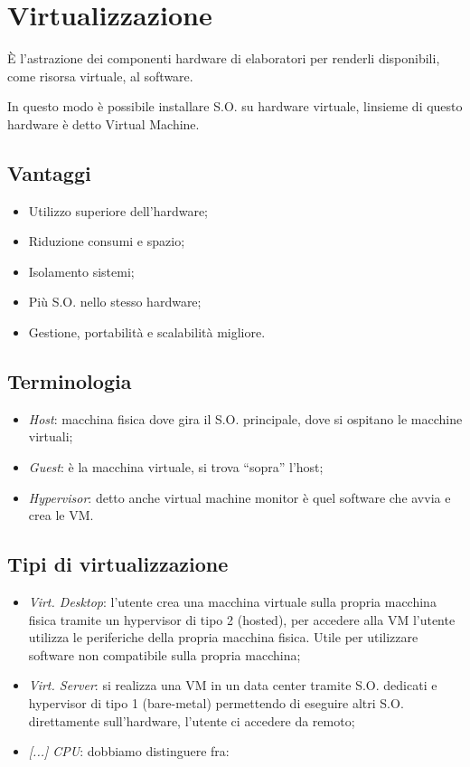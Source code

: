 \section{Virtualizzazione}\label{virtualizzazione}

È l'astrazione dei componenti hardware di elaboratori per renderli
disponibili, come risorsa virtuale, al software.

In questo modo è possibile installare S.O. su hardware virtuale,
l\textquotesingle insieme di questo hardware è detto Virtual Machine.

\subsection{Vantaggi}\label{vantaggi}

\begin{itemize}
\item
  Utilizzo superiore dell'hardware;
\item
  Riduzione consumi e spazio;
\item
  Isolamento sistemi;
\item
  Più S.O. nello stesso hardware;
\item
  Gestione, portabilità e scalabilità migliore.
\end{itemize}

\subsection{Terminologia}\label{terminologia}

\begin{itemize}
\item
  \emph{Host}: macchina fisica dove gira il S.O. principale, dove si
  ospitano le macchine virtuali;
\item
  \emph{Guest}: è la macchina virtuale, si trova ``sopra'' l'host;
\item
  \emph{Hypervisor}: detto anche virtual machine monitor è quel software
  che avvia e crea le VM.
\end{itemize}

\subsection{Tipi di virtualizzazione}\label{tipi-di-virtualizzazione}

\begin{itemize}
\item
  \emph{Virt. Desktop}: l'utente crea una macchina virtuale sulla
  propria macchina fisica tramite un hypervisor di tipo 2 (hosted), per
  accedere alla VM l'utente utilizza le periferiche della propria
  macchina fisica. Utile per utilizzare software non compatibile sulla
  propria macchina;
\item
  \emph{Virt. Server}: si realizza una VM in un data center tramite S.O.
  dedicati e hypervisor di tipo 1 (bare-metal) permettendo di eseguire
  altri S.O. direttamente sull'hardware, l'utente ci accedere da remoto;
\item
  \emph{{[}...{]} CPU}: dobbiamo distinguere fra:
\end{itemize}

